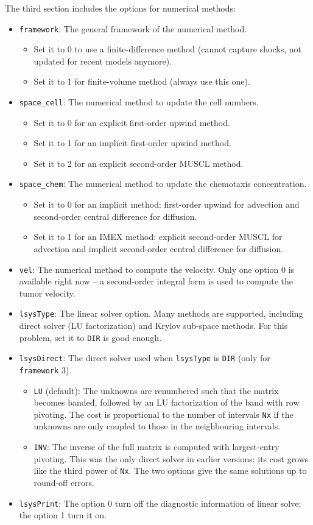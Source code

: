 \documentclass{amsproc}
\theoremstyle{definition}
\theoremstyle{remark}
\numberwithin{equation}{section}
\numberwithin{figure}{section}
\begin{document}
The third section includes the options for numerical methods:
\begin{itemize}
\item \texttt{framework}: The general framework of the numerical method.
  \begin{itemize}
    \item Set it to 0 to use a finite-difference method (cannot capture shocks, not updated for recent models anymore).
    \item Set it to 1 for finite-volume method (always use this one).
  \end{itemize}
\item \texttt{space\_cell}: The numerical method to update the cell numbers. 
  \begin{itemize}
    \item Set it to 0 for an explicit first-order upwind method.
    \item Set it to 1 for an implicit first-order upwind method.
    \item Set it to 2 for an explicit second-order MUSCL method.
  \end{itemize}
\item \texttt{space\_chem}: The numerical method to update the chemotaxis concentration. 
  \begin{itemize}
    \item Set it to 0 for an implicit method: first-order upwind for advection and second-order central difference for diffusion.
    \item Set it to 1 for an IMEX method: explicit second-order MUSCL for advection and implicit second-order central difference for diffusion.
  \end{itemize}
\item \texttt{vel}: The numerical method to compute the velocity.
Only one option 0 is available right now -- a second-order integral form is used to compute the tumor velocity.
\item \texttt{lsysType}: The linear solver option.
Many methods are supported, including direct solver (LU factorization) and Krylov sub-space methods.
For this problem, set it to \texttt{DIR} is good enough.
\item \texttt{lsysDirect}: The direct solver used when \texttt{lsysType} is \texttt{DIR} (only for \texttt{framework} 3).
  \begin{itemize}
    \item \texttt{LU} (default): The unknowns are renumbered such that the matrix becomes banded, followed by an LU factorization of the band with row pivoting. The cost is proportional to the number of intervals \texttt{Nx} if the unknowns are only coupled to those in the neighbouring intervals.
    \item \texttt{INV}: The inverse of the full matrix is computed with largest-entry pivoting. This was the only direct solver in earlier versions; its cost grows like the third power of \texttt{Nx}. The two options give the same solutions up to round-off errors.
  \end{itemize}
\item \texttt{lsysPrint}: The option 0 turn off the diagnostic information of linear solve; the option 1 turn it on.
\end{itemize}
\end{document}
